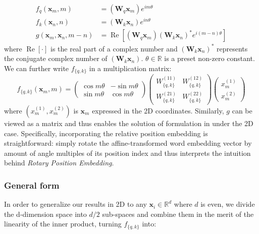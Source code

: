 \documentclass{article}
\def\x{{\boldsymbol x}}
\def\W{{\boldsymbol W}}
\begin{document}
\begin{equation}
	\begin{aligned}
		f_q(\x_m, m) &= (\W_q\x_m)e^{im\theta}\\
		f_k(\x_n, n) &= (\W_k\x_n)e^{in\theta}\\
		g(\x_m, \x_n, m - n) &= \operatorname{Re}[(\W_q\x_m)(\W_k\x_n)^{*}e^{i(m - n)\theta}]
	\end{aligned}
	\label{fn:res-2d}
\end{equation}
where $\operatorname{Re}[\cdot]$ is the real part of a complex number and $(\W_k\x_n)^{*}$ represents the conjugate complex number of $(\W_k\x_n)$. $\theta \in \mathbb{R}$ is a preset non-zero constant. We can further write $f_{\{q, k\}}$ in a multiplication matrix: 
\begin{equation}
	f_{\{q, k\}}(\x_m, m) = \left(
	\begin{array}{cc}
		\cos{m\theta}& -\sin{m\theta}  \\
		\sin{m\theta}&\cos{m\theta} 
	\end{array}
	\right)
	\left(
	\begin{array}{cc}
		W^{(11)}_{\{q, k\}} & W^{(12)}_{\{q, k\}} \\
		W^{(21)}_{\{q, k\}} & W^{(22)}_{\{q, k\}}
	\end{array}
	\right)
	\left(
	\begin{array}{cc}
		x^{(1)}_m\\
		x^{(2)}_m
	\end{array}
	\right)
\end{equation}
where $(x^{(1)}_m, x^{(2)}_m)$ is $\x_m$ expressed in the 2D coordinates. Similarly, $g$ can be viewed as a matrix  and thus enables the solution of formulation in  under the 2D case. Specifically, incorporating the relative position embedding is straightforward: simply rotate the affine-transformed word embedding vector by amount of angle multiples of its position index and thus interprets the intuition behind \textit{Rotary Position Embedding}. 

\subsubsection{General form}\label{subsec:general-form}
In order to generalize our results in 2D to any $\x_i \in \mathbb{R}^d$ where $d$ is even,  we divide the d-dimension space into $d/2$ sub-spaces and combine them in the merit of the linearity of the inner product, turning $f_{\{q, k\}}$ into: 
\end{document}
